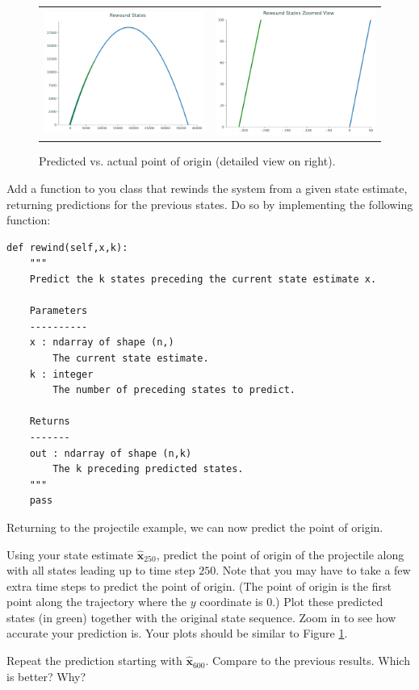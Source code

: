 \begin{figure}[htb]
    \centering
    \begin{tabular}{cc}
    \includegraphics[width=.45\textwidth]{figures/origin_macro} &
    \includegraphics[width=.45\textwidth]{figures/origin_micro}
    \end{tabular}
    \caption{Predicted vs. actual point of origin (detailed view on right).}
    \label{fig:origin}
\end{figure}

\begin{problem}
Add a function to you class that rewinds the system from a given state estimate, returning predictions for the previous states.
Do so by implementing the following function:
\begin{lstlisting}
def rewind(self,x,k):
    """
    Predict the k states preceding the current state estimate x.

    Parameters
    ----------
    x : ndarray of shape (n,)
        The current state estimate.
    k : integer
        The number of preceding states to predict.

    Returns
    -------
    out : ndarray of shape (n,k)
        The k preceding predicted states.
    """
    pass
\end{lstlisting}
\end{problem}

Returning to the projectile example, we can now predict the point of origin.

\begin{problem}
Using your state estimate $\widehat{\mathbf{x}}_{250}$, predict the point of origin of the projectile along with
all states leading up to time step $250$. Note that you may have to take a few extra time steps to predict the point of origin.
(The point of origin is the first point along the trajectory where the $y$ coordinate is $0$.)
Plot these predicted states (in green) together with the original state sequence.
Zoom in to see how accurate your prediction is.
Your plots should be similar to Figure \ref{fig:origin}.
\label{prob:origin_pt}

Repeat the prediction starting with $\widehat{\mathbf{x}}_{600}$.  Compare to the previous results.  Which is better?  Why?
\end{problem}